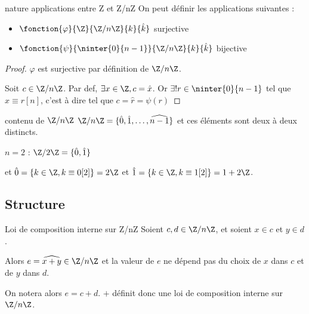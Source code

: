 \begin{theorement}{nature applications entre Z et Z/nZ}{}
    On peut définir les applications suivantes : 
    \begin{itemize}
        \item $\fonction{\varphi}{\Z}{\Z/n\Z}{k}{\hat k}$ surjective
        \item \avspace $\fonction{\psi}{\ninter{0}{n-1}}{\Z/n\Z}{k}{\hat k}$ bijective
    \end{itemize}
\end{theorement}


\begin{proof}
    $\varphi$ est surjective par définition de $\Z/n\Z$.

    Soit $c \in \Z/n\Z$. Par def, $\exists x \in \Z, c = \hat x$. Or $\exists ! r \in \ninter{0}{n-1}$ 
    tel que $x \equiv r [n]$, c'est à dire tel que $c = \hat r = \psi(r)$
\end{proof}

\begin{corollaire}{contenu de $\Z/n\Z$}{}
    $\Z/n\Z = \{\hat 0, \hat 1, \ldots, \widehat{n-1}\}$ et ces éléments sont 
    deux à deux distincts.
\end{corollaire}

\begin{exemple}
    $n = 2$ : $\Z/2\Z = \{\hat 0, \hat 1\}$

    et $\hat 0 = \{k \in \Z, k \equiv 0 [2]\} = 2 \Z$ et $\hat 1 = \{k \in \Z, k \equiv 1 [2]\} = 1 + 2 \Z$.
\end{exemple}

\subsection{Structure }

\begin{proposition}{Loi de composition interne sur Z/nZ}{}
    Soient $c, d \in \Z/n\Z$, et soient $x \in c$ et $y \in d$. 

    Alors $e = \widehat{x + y} \in \Z/n \Z$ et la valeur de $e$ ne dépend pas du choix de $x$
    dans $c$ et de $y$ dans $d$.

    On notera alors $e = c + d$.
    $+$ définit donc une loi de composition interne sur $\Z/n\Z$.
\end{proposition}


